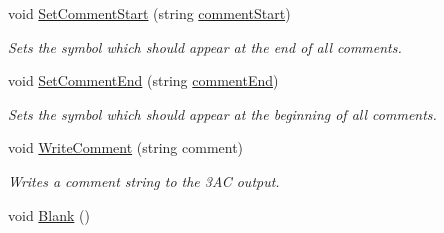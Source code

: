\begin{DoxyCompactItemize}
void \hyperlink{classTAC__Generator_a8570a01bd5bf10e849017d412440799a}{Set\-Comment\-Start} (string \hyperlink{classTAC__Generator_ac530666b410f226e764e9eb33b2a4666}{comment\-Start})
\begin{DoxyCompactList}\small\item\em Sets the symbol which should appear at the end of all comments. \end{DoxyCompactList}\item 
void \hyperlink{classTAC__Generator_ad96d5a262c29a34a34324ed6c7aeffe1}{Set\-Comment\-End} (string \hyperlink{classTAC__Generator_a9f011cfb810ea2cd01b31b9a48762123}{comment\-End})
\begin{DoxyCompactList}\small\item\em Sets the symbol which should appear at the beginning of all comments. \end{DoxyCompactList}\item 
void \hyperlink{classTAC__Generator_a37a03e11321195b25600eb008b20b800}{Write\-Comment} (string comment)
\begin{DoxyCompactList}\small\item\em Writes a comment string to the 3\-A\-C output. \end{DoxyCompactList}\item 
\hypertarget{classTAC__Generator_a3351d9d0d43b7b33591ed556c0261b84}{void \hyperlink{classTAC__Generator_a3351d9d0d43b7b33591ed556c0261b84}{Blank} ()}\label{classTAC__Generator_a3351d9d0d43b7b33591ed556c0261b84}


\end{DoxyCompactItemize}
